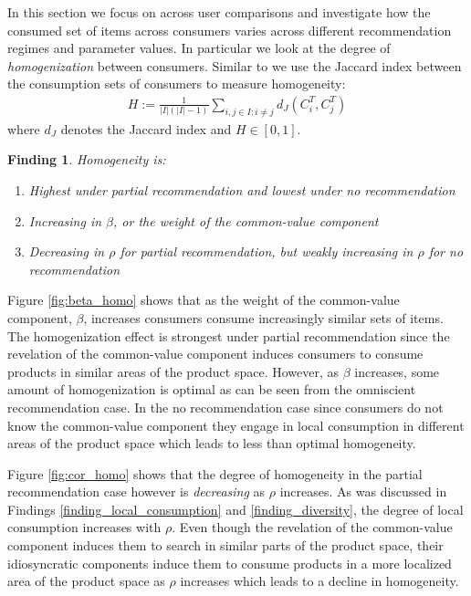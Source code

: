 \documentclass[sigconf]{acmart}
\newtheorem{finding}{Finding}
\begin{document}
In this section we focus on across user comparisons and investigate how the consumed set of items across consumers varies across different recommendation regimes and parameter values. In particular we look at the degree of \textit{homogenization} between consumers. Similar to \cite{chaney2018algorithmic} we use the Jaccard index between the consumption sets of consumers to measure homogeneity:
\begin{align*}
H:=\frac{1}{|I|(|I|-1)}\sum_{i,j \in I: i \ne j}d_J(C_i^T,C_j^T)
\end{align*}
where $d_J$ denotes the Jaccard index and $H \in [0,1]$.
\begin{finding}\label{finding_homogeneity}
Homogeneity is:
\begin{enumerate}
\item Highest under partial recommendation and lowest under no recommendation
\item Increasing in $\beta$, or the weight of the common-value component
\item Decreasing in $\rho$ for partial recommendation, but weakly increasing in $\rho$ for no recommendation
\end{enumerate}
\end{finding}

Figure \ref{fig:beta_homo} shows that as the weight of the common-value component, $\beta$, increases consumers consume increasingly similar sets of items. The homogenization effect is strongest under partial recommendation since the revelation of the common-value component induces consumers to consume products in similar areas of the product space. However, as $\beta$ increases, some amount of homogenization is optimal as can be seen from the omniscient recommendation case. In the no recommendation case since consumers do not know the common-value component they engage in local consumption in different areas of the product space which leads to less than optimal homogeneity.

Figure \ref{fig:cor_homo} shows that the degree of homogeneity in the partial recommendation case however is \textit{decreasing} as $\rho$ increases. As was discussed in Findings \ref{finding_local_consumption} and \ref{finding_diversity}, the degree of local consumption increases with $\rho$. Even though the revelation of the common-value component induces them to search in similar parts of the product space, their idiosyncratic components induce them to consume products in a more localized area of the product space as $\rho$ increases which leads to a decline in homogeneity.
\end{document}
